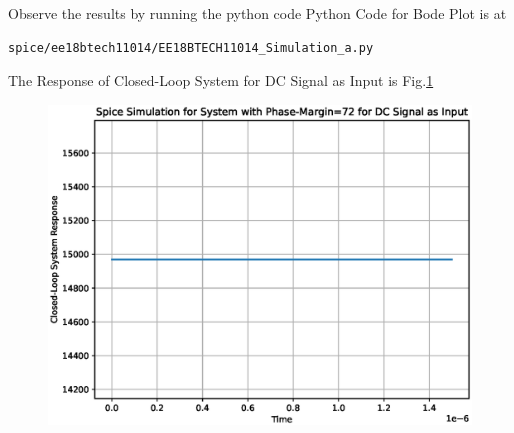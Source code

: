 \begin{enumerate}[label=\thesection.\arabic*.,ref=\thesection.\theenumi]
Observe the results by running the python code
Python Code for Bode Plot is at
\begin{lstlisting}
spice/ee18btech11014/EE18BTECH11014_Simulation_a.py
\end{lstlisting}

The Response of Closed-Loop System for DC Signal as Input is Fig.\ref{fig:DC}
\begin{figure}[ht!]
	\begin{center}
		\includegraphics[width=\columnwidth]{./figs/ee18btech11014/ee18btech11014_Spice_Result_PM=72.eps}
	\end{center}
	\caption{}
	\label{fig:DC}
\end{figure}

\end{enumerate}
